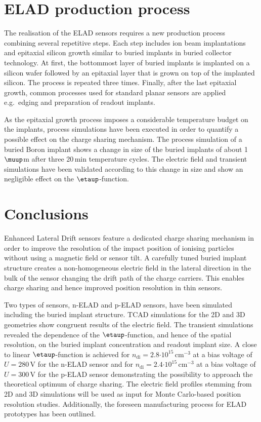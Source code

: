 \documentclass[a4paper,11pt]{article}
\begin{document}
\section{ELAD production process}
\label{sec:pr}
The realisation of the ELAD sensors requires a new production process combining several repetitive steps.
Each step includes ion beam implantations and epitaxial silicon growth similar to buried implants in buried collector technology. 
At first, the bottommost layer of buried implants is implanted on a silicon wafer followed by an epitaxial layer that is grown on top of the implanted silicon. 
The process is repeated three times. 
Finally, after the last epitaxial growth, common processes used for standard planar sensors are applied e.g.\ edging and preparation of readout implants.

As the epitaxial growth process imposes a considerable temperature budget on the implants, process simulations have been executed in order to quantify a possible effect on the charge sharing mechanism. 
The process simulation of a buried Boron implant shows a change in size of the buried implants of about 1\,$\muup$m after three 20\,min temperature cycles. 
The electric field and transient simulations have been validated according to this change in size and show an negligible effect on the $\etaup$-function.


\section{Conclusions}
Enhanced Lateral Drift sensors feature a dedicated charge sharing mechanism in order to improve the resolution of the impact position of ionising particles without using a magnetic field or sensor tilt.
A carefully tuned buried implant structure creates a non-homogeneous electric field in the lateral direction in the bulk of the sensor changing the drift path of the charge carriers.
This enables charge sharing and hence improved position resolution in thin sensors. 

Two types of sensors, n-ELAD and p-ELAD sensors, have been simulated including the buried implant structure. 
TCAD simulations for the 2D and 3D geometries show congruent results of the electric field.
The transient simulations revealed the dependence of the $\etaup$-function, and hence of the spatial resolution, on the buried implant concentration and readout implant size.
A close to linear $\etaup$-function is achieved for $n\mathrm{_{di}} = 2.8 \mathrm{\cdot10^{15}\,cm^{-3}}$ at a bias voltage of $U=280$\,V for the n-ELAD sensor 
 and for $n\mathrm{_{di}} = 2.4 \mathrm{\cdot10^{15}\,cm^{-3}}$ at a bias voltage of $U=300$\,V for the p-ELAD sensor
 demonstrating the possibility to approach the theoretical optimum of charge sharing.
The electric field profiles stemming from 2D and 3D simulations will be used as input for Monte Carlo-based position resolution studies.
Additionally, the foreseen manufacturing process for ELAD prototypes has been outlined. 
\end{document}
